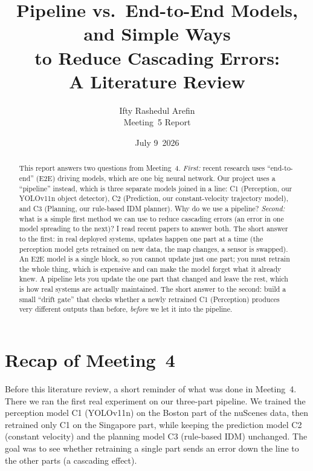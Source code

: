 \documentclass[11pt,a4paper]{article}
\title{Pipeline vs.\ End-to-End Models, and Simple Ways\\
to Reduce Cascading Errors:\\
A Literature Review}
\author{Ifty Rashedul Arefin\\[2pt]
        \small Meeting~5 Report}
\date{July 9~2026}
\begin{document}
\maketitle

\begin{abstract}
This report answers two questions from Meeting~4. \emph{First:} recent
research uses ``end-to-end'' (E2E) driving models, which are one big
neural network. Our project uses a ``pipeline'' instead, which is three
separate models joined in a line: C1 (Perception, our YOLOv11n object
detector), C2 (Prediction, our constant-velocity trajectory model), and
C3 (Planning, our rule-based IDM planner). Why do we use a pipeline?
\emph{Second:}
what is a simple first method we can use to reduce cascading errors (an
error in one model spreading to the next)? I read recent papers to
answer both. The short answer to the first: in real deployed systems,
updates happen one part at a time (the perception model gets retrained
on new data, the map changes, a sensor is swapped). An E2E model is a
single block, so you cannot update just one part; you must retrain the
whole thing, which is expensive and can make the model forget what it
already knew. A pipeline lets you update the one part that changed and
leave the rest, which is how real systems are actually maintained. The
short answer to the second: build a small ``drift gate''
that checks whether a newly retrained C1 (Perception) produces very
different outputs than before, \emph{before} we let it into the pipeline.
\end{abstract}

\section{Recap of Meeting~4}
Before this literature review, a short reminder of what was done in
Meeting~4. There we ran the first real experiment on our three-part pipeline.
We trained the perception model C1 (YOLOv11n) on the Boston part of the nuScenes
data, then retrained only C1 on the Singapore part, while keeping the
prediction model C2 (constant velocity) and the planning model C3 (rule-based
IDM) unchanged. The goal was to see whether retraining a single part sends an
error down the line to the other parts (a cascading effect).
\end{document}
